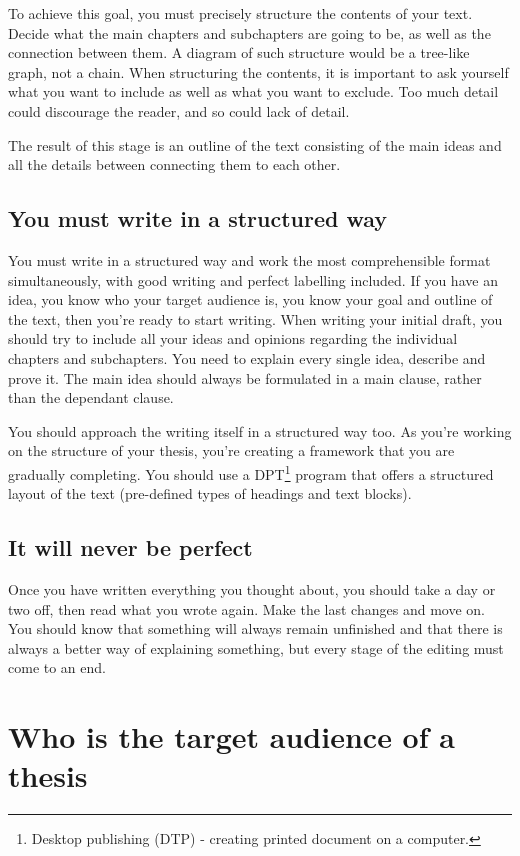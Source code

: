To achieve this goal, you must precisely structure the contents of your text. Decide what the main chapters and subchapters are going to be, as well as the connection between them. A diagram of such structure would be a tree-like graph, not a chain. When structuring the contents, it is important to ask yourself what you want to include as well as what you want to exclude. Too much detail could discourage the reader, and so could lack of detail.

The result of this stage is an outline of the text consisting of the main ideas and all the details between connecting them to each other.

\subsection{You must write in a structured way}

You must write in a structured way and work the most comprehensible format simultaneously, with good writing and perfect labelling included. If you have an idea, you know who your target audience is, you know your goal and outline of the text, then you're ready to start writing. When writing your initial draft, you should try to include all your ideas and opinions regarding the individual chapters and subchapters. You need to explain every single idea, describe and prove it. The main idea should always be formulated in a main clause, rather than the dependant clause.

You should approach the writing itself in a structured way too. As you're working on the structure of your thesis, you're creating a framework that you are gradually completing. You should use a DPT\footnote{Desktop publishing (DTP) - creating printed document on a computer.} program that offers a structured layout of the text (pre-defined types of headings and text blocks).

\subsection{It will never be perfect}
Once you have written everything you thought about, you should take a day or two off, then read what you wrote again. Make the last changes and move on. You should know that something will always remain unfinished and that there is always a better way of explaining something, but every stage of the editing must come to an end.

\section{Who is the target audience of a thesis}

